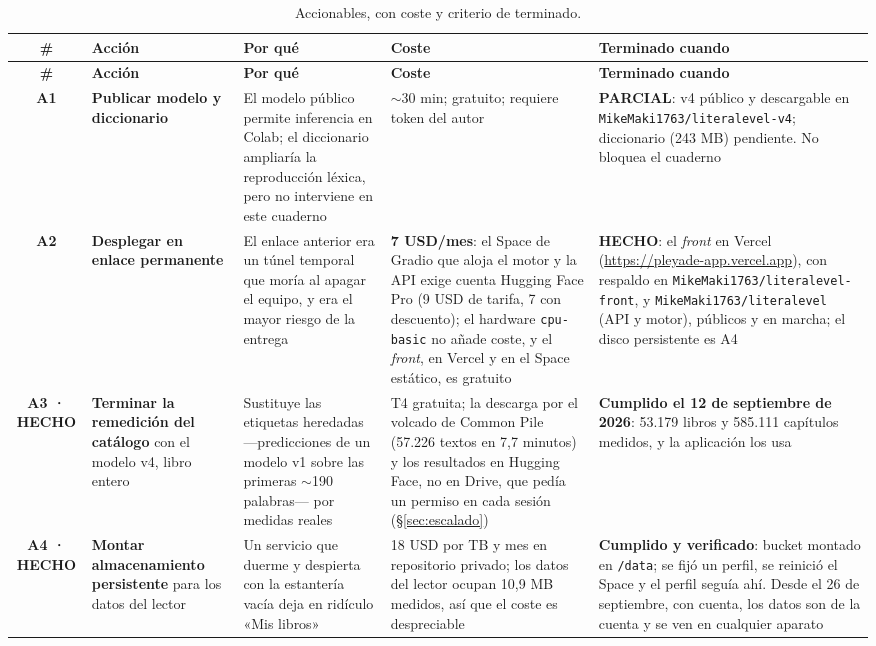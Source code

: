 \documentclass[11pt,a4paper]{article}
\newcommand{\cod}[1]{\texttt{\small #1}}
\begin{document}
\begin{small}
\begin{longtable}{@{}c L{2.6cm} L{3.0cm} L{2.9cm} L{3.2cm}@{}}
\toprule
\textbf{\#} & \textbf{Acción} & \textbf{Por qué} & \textbf{Coste} & \textbf{Terminado cuando} \\
\midrule
\endfirsthead
\toprule
\textbf{\#} & \textbf{Acción} & \textbf{Por qué} & \textbf{Coste} & \textbf{Terminado cuando} \\
\midrule
\endhead
\bottomrule
\endfoot
\bottomrule
\caption{Accionables, con coste y criterio de terminado.}
\label{cuad:accionables}
\endlastfoot
\textbf{A1} & \textbf{Publicar modelo y diccionario} & El modelo público permite inferencia en Colab; el diccionario ampliaría la reproducción léxica, pero no interviene en este cuaderno & $\sim$30 min; gratuito; requiere token del autor & \textbf{PARCIAL}: v4 público y descargable en \cod{MikeMaki1763/\allowbreak literalevel-v4}; diccionario (243 MB) pendiente. No bloquea el cuaderno \\
\addlinespace
\textbf{A2} & \textbf{Desplegar en enlace permanente} & El enlace anterior era un túnel temporal que moría al apagar el equipo, y era el mayor riesgo de la entrega & \textbf{7 USD/mes}: el Space de Gradio que aloja el motor y la API exige cuenta Hugging Face Pro (9 USD de tarifa, 7 con descuento); el hardware \cod{cpu-basic} no añade coste, y el \emph{front}, en Vercel y en el Space estático, es gratuito & \textbf{HECHO}: el \emph{front} en Vercel (\url{https://pleyade-app.vercel.app}), con respaldo en \cod{MikeMaki1763/\allowbreak literalevel-\allowbreak front}, y \cod{MikeMaki1763/\allowbreak literalevel} (API y motor), públicos y en marcha; el disco persistente es A4 \\
\addlinespace
\textbf{A3 · HECHO} & \textbf{Terminar la remedición del catálogo} con el modelo v4, libro entero & Sustituye las etiquetas heredadas —predicciones de un modelo v1 sobre las primeras $\sim$190 palabras— por medidas reales & T4 gratuita; la descarga por el volcado de Common Pile (57.226 textos en 7,7 minutos) y los resultados en Hugging Face, no en Drive, que pedía un permiso en cada sesión (\S\ref{sec:escalado}) & \textbf{Cumplido el 12 de septiembre de 2026}: 53.179 libros y 585.111 capítulos medidos, y la aplicación los usa \\
\addlinespace
\textbf{A4 · HECHO} & \textbf{Montar almacenamiento persistente} para los datos del lector & Un servicio que duerme y despierta con la estantería vacía deja en ridículo «Mis libros» & 18 USD por TB y mes en repositorio privado; los datos del lector ocupan 10,9 MB medidos, así que el coste es despreciable & \textbf{Cumplido y verificado}: bucket montado en \cod{/data}; se fijó un perfil, se reinició el Space y el perfil seguía ahí. Desde el 26 de septiembre, con cuenta, los datos son de la cuenta y se ven en cualquier aparato \\

\end{longtable}
\end{small}
\end{document}
